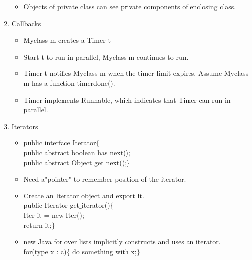 \documentclass[a4paper]{article}
\begin{document}
\begin{enumerate}
\begin{itemize}
        \item Objects of private class can see private components of enclosing class.
    \end{itemize}
    \item Callbacks
    \begin{itemize}
        \item Myclass m creates a Timer t
        \item Start t to run in parallel, Myclass m continues to run.
        \item Timer t notifies Myclass m when the timer limit expires. Assume Myclass m has a function timerdone().
        \item Timer implements Runnable, which indicates that Timer can run in parallel.
    \end{itemize}
    \item Iterators
    \begin{itemize}
        \item public interface Iterator$\{$\\
        public abstract boolean has$\_$next();\\
        public abstract Object get$\_$next();$\}$
        \item Need a"pointer" to remember position of the iterator.
        \item Create an Iterator object and export it.\\
        public Iterator get$\_$iterator()$\{$\\
        Iter it = new Iter();\\
        return it;$\}$
        \item new Java for over lists implicitly constructs and uses an iterator.\\
        for(type x : a)$\{$
        do something with x;$\}$
    \end{itemize}
\end{enumerate}
\end{document}
